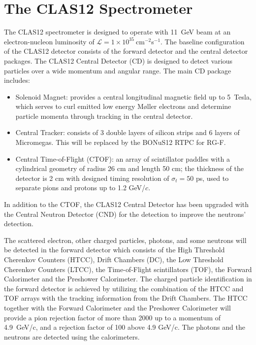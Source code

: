 \documentclass[12pt]{article}
\begin{document}
\section{The CLAS12 Spectrometer}
The CLAS12 spectrometer is designed to operate with 11~GeV beam at an 
electron-nucleon luminosity of $\mathcal{L} = 
1\times10^{35}~$cm$^{-2}$s$^{-1}$. The baseline configuration of the CLAS12 
detector consists of the forward detector and the central detector packages.
The CLAS12 Central Detector (CD) is designed to detect various particles over a 
wide momentum and angular range. The main CD package includes:
\begin{itemize}
 \item Solenoid Magnet: provides a central longitudinal magnetic field up to 
5~Tesla, which serves to curl emitted low energy M{\o}ller electrons and determine 
particle momenta through tracking in the central detector.
 \item Central Tracker: consists of 3 double layers of silicon strips and 6 
 layers of Micromegas. This will be replaced by the BONuS12 RTPC for RG-F.  
 \item Central Time-of-Flight (CTOF): an array of scintillator paddles with a 
    cylindrical geometry of radius 26 cm and length 50 cm; the thickness of the 
      detector is 2 cm with designed timing resolution of $\sigma_t = 50$ ps, 
      used to separate pions and protons up to 1.2 GeV/$c$.
\end{itemize}

In addition to the CTOF, the CLAS12 Central Detector has been upgraded with the  
Central Neutron Detector (CND) for the detection to improve the neutrons' 
detection. 


The scattered electron, other charged particles, photons, and some neutrons 
will be detected in the forward detector which consists of the High Threshold 
Cherenkov Counters (HTCC), Drift Chambers (DC), the Low Threshold Cherenkov 
Counters (LTCC), the Time-of-Flight scintillators (TOF), the Forward 
Calorimeter and the Preshower Calorimeter. The charged particle identification 
in the forward detector is achieved by utilizing the combination of the HTCC 
and TOF arrays with the tracking information from the Drift Chambers. The HTCC 
together with the Forward Calorimeter and the Preshower Calorimeter will 
provide a pion rejection factor of more than 2000 up to a momentum of 
4.9~GeV/c, and a rejection factor of 100 above 4.9 GeV/c. The photons and the 
neutrons are detected using the calorimeters. 
\end{document}
